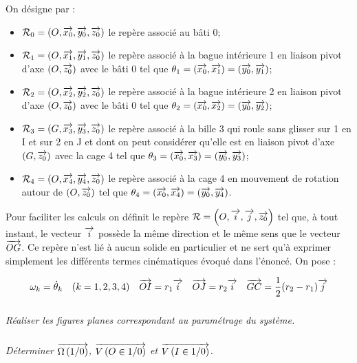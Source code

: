 \documentclass[10pt,oneside]{article}
\begin{document}
On désigne par :
\begin{itemize}
\item $\mathcal{R}_0 = \left(O,\overrightarrow{x_0},\overrightarrow{y_0},\overrightarrow{z_0}\right)$ le repère associé au bâti 0;
\item $\mathcal{R}_1 = \left(O,\overrightarrow{x_1},\overrightarrow{y_1},\overrightarrow{z_0}\right)$ le repère associé à la bague intérieure 1 en liaison pivot d'axe $(O,\overrightarrow{z_0})$ avec le bâti 0 tel que $\theta_1 = \left(\overrightarrow{x_0},\overrightarrow{x_1}\right) = \left(\overrightarrow{y_0},\overrightarrow{y_1}\right)$;
\item $\mathcal{R}_2 = \left(O,\overrightarrow{x_2},\overrightarrow{y_2},\overrightarrow{z_0}\right)$ le repère associé à la bague intérieure 2 en liaison pivot d'axe $(O,\overrightarrow{z_0})$ avec le bâti 0 tel que $\theta_2 = \left(\overrightarrow{x_0},\overrightarrow{x_2}\right) = \left(\overrightarrow{y_0},\overrightarrow{y_2}\right)$;
\item $\mathcal{R}_3 = \left(G,\overrightarrow{x_3},\overrightarrow{y_3},\overrightarrow{z_0}\right)$ le repère associé à la bille 3 qui roule sans glisser sur 1 en I et sur 2 en J et dont on peut considérer qu'elle est en liaison pivot d'axe $(G,\overrightarrow{z_0})$ avec la cage 4 tel que $\theta_3 = \left(\overrightarrow{x_0},\overrightarrow{x_3}\right) = \left(\overrightarrow{y_0},\overrightarrow{y_3}\right)$;
\item $\mathcal{R}_4 = \left(O,\overrightarrow{x_4},\overrightarrow{y_4},\overrightarrow{z_0}\right)$ le repère associé à la cage 4 en mouvement de rotation autour de $(O,\overrightarrow{z_0})$ tel que $\theta_4 = \left(\overrightarrow{x_0},\overrightarrow{x_4}\right) = \left(\overrightarrow{y_0},\overrightarrow{y_4}\right)$.
\end{itemize}

Pour faciliter les calculs on définit le repère $\mathcal{R}=\left(O,\overrightarrow{i},\overrightarrow{j},\overrightarrow{z_0} \right)$ tel que, à tout instant, le vecteur $\overrightarrow{i}$ possède la même direction et le même sens que le vecteur $\overrightarrow{OG}$. Ce repère n'est lié à aucun solide en particulier et ne sert qu'à exprimer simplement les différents termes cinématiques évoqué dans l'énoncé. On pose :

$$
\omega_k = \dot{\theta}_k \quad (k=1,2,3,4) \quad \overrightarrow{OI}=r_1 \overrightarrow{i} \quad \overrightarrow{OJ}=r_2\overrightarrow{i} \quad \overrightarrow{GC}=\dfrac{1}{2}(r_2-r_1)\overrightarrow{j}
$$

\subparagraph{}
\textit{Réaliser les figures planes correspondant au paramétrage du système.}

\subparagraph{}
\textit{Déterminer $\overrightarrow{\Omega\left( {1}/{0}\right)}$,  $\overrightarrow{V\left( {O} \in {1}/{0}\right)}$ et $\overrightarrow{V\left( {I} \in {1}/{0}\right)}$.}

\end{document}
